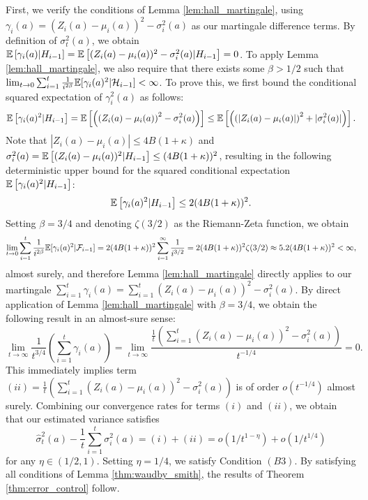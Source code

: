 \documentclass{article}
\begin{document}
\begin{appendices}
First, we verify the conditions of Lemma \ref{lem:hall_martingale}, using $\gamma_i(a)=(Z_i(a) - \mu_i(a))^2 - \sigma_i^2(a)$ as our martingale difference terms. By definition of $\sigma^2_t(a)$, we obtain $ \mathbb{E}\left[ \gamma_i(a) | H_{i-1}\right] = \mathbb{E}\left[(Z_i(a) - \mu_i(a))^2 - \sigma_i^2(a) | H_{i-1}\right] = 0$. To apply Lemma \ref{lem:hall_martingale}, we also require that there exists some $\beta > 1/2$ such that $\lim_{t \rightarrow 0 }\sum_{i=1}^t \frac{1}{i^{2\beta}} \mathbb{E}[\gamma_i(a)^2 | \mathcal{H}_{i-1}] < \infty$. To prove this, we first bound the conditional squared expectation of $\gamma_i^2(a)$ as follows:
\begin{equation}
    \mathbb{E}\left[\gamma_i(a)^2 | H_{i-1} \right] = \mathbb{E}\left[\left( \left({Z_i(a)} - \mu_i(a)\right)^2 - \sigma_i^2(a) \right)\right] \leq \mathbb{E}\left[\left( \left(|Z_i(a) - \mu_i(a)|\right)^2 + |\sigma_i^2(a)| \right)\right].
\end{equation}
Note that $|Z_i(a) - \mu_i(a)| \leq 4B(1 + \kappa )$ and $\sigma_i^2(a) = \mathbb{E}\left[(Z_i(a) - \mu_i(a))^2 | H_{i-1} \right] \leq (4B(1 + \kappa ))^2$, resulting in the following deterministic upper bound for the squared conditional expectation $ \mathbb{E}\left[\gamma_i(a)^2 | H_{i-1} \right]$:
\begin{equation}
    \mathbb{E}\left[\gamma_i(a)^2 | H_{i-1} \right] \leq 2(4B(1 + \kappa ))^2.
\end{equation}
Setting $\beta = 3/4$ and denoting $\zeta(3/2)$ as the Riemann-Zeta function, we obtain
\begin{equation}
    \lim_{t \rightarrow 0 }\sum_{i=1}^t \frac{1}{i^{2\beta}} \mathbb{E}[\gamma_i(a)^2 | \mathcal{F}_{i-1}] = 2(4B(1+\kappa))^2 \sum_{i=1}^\infty \frac{1}{i^{3/2}} = 2(4B(1+\kappa))^2\zeta(3/2) \approx 5.2(4B(1+\kappa))^2 < \infty,
\end{equation}
almost surely, and therefore Lemma \ref{lem:hall_martingale} directly applies to our martingale $\sum_{i=1}^t \gamma_i(a) = \sum_{i=1}^t (Z_i(a) - \mu_i(a))^2 - \sigma_i^2(a)$. By direct application of Lemma \ref{lem:hall_martingale} with $\beta = 3/4$, we obtain the following result in an almost-sure sense:
\begin{equation}
    \lim_{t \rightarrow \infty}\frac{1}{t^{3/4}}\left( \sum_{i=1}^t \gamma_i(a)\right) = \lim_{t \rightarrow \infty}\frac{\frac{1}{t}\left(\sum_{i=1}^t(Z_i(a) - \mu_i(a))^2 - \sigma_i^2(a)\right)}{t^{-1/4}} =  0.
\end{equation}
This immediately implies term $(ii) = \frac{1}{t}\left(\sum_{i=1}^t(Z_i(a) - \mu_i(a))^2 - \sigma_i^2(a)\right)$ is of order $o(t^{-1/4})$ almost surely. Combining our convergence rates for terms $(i)$ and $(ii)$, we obtain that our estimated variance satisfies
\begin{equation}
    \hat\sigma_t^2(a) - \frac{1}{t}\sum_{i=1}^t \sigma_i^2(a) = (i) + (ii) = o(1/t^{1-\eta}) + o(1/t^{1/4})
\end{equation}
for any $\eta \in (1/2, 1)$. Setting $\eta = 1/4$, we satisfy Condition $(B3)$. By satisfying all conditions of Lemma \ref{thm:waudby_smith}, the results of Theorem \ref{thm:error_control} follow. 




\end{appendices}
\end{document}

